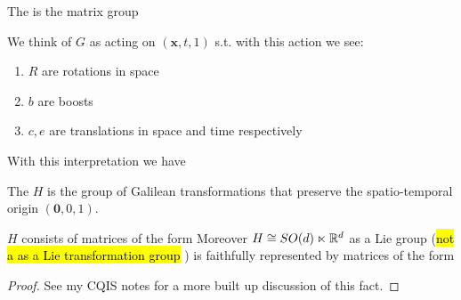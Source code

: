 \documentclass{article}
\begin{document}
\begin{definition}
The  is the matrix group
\end{definition}

We think of $G$ as acting on $(\bm{x},t,1)$ s.t. 
with this action we see:
\begin{enumerate}
	\item $R$ are rotations in space
	\item $b$ are boosts
	\item $c,e$ are translations in space and time respectively
\end{enumerate}

With this interpretation we have

\begin{definition}
	The  $H$ is the group of Galilean transformations that preserve the spatio-temporal origin $(\bm{0},0,1)$. 
\end{definition}

\begin{prop}
	$H$ consists of matrices of the form 
Moreover $H \cong SO(d)\ltimes \mathbb{R}^d$ as a Lie group (\hl{not a as a Lie transformation group} \cite{Kunzle1972} ) is faithfully represented by matrices of the form 
\end{prop}
\begin{proof}
	See my CQIS notes for a more built up discussion of this fact. 
\end{proof}
\end{document}

